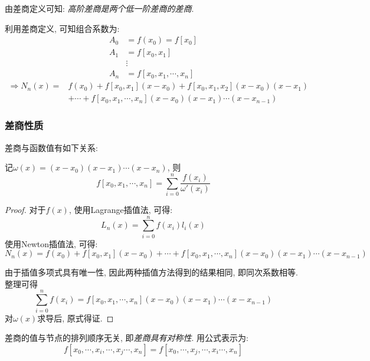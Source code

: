 由差商定义可知: \emph{高阶差商是两个低一阶差商的差商}.

利用差商定义, 可知组合系数为:
\begin{align*}
    A_0&=f(x_0)=f[x_0]\\
    A_1&=f[x_0,x_1]\\
    &\vdots\\
    A_n&=f[x_0,x_1,\cdots,x_n]
\end{align*}
\begin{align*}
    \Rightarrow N_n(x)=&f(x_0)+f[x_0,x_1](x-x_0)+f[x_0,x_1,x_2](x-x_0)(x-x_1)\\
    &+\cdots+f[x_0,x_1,\cdots,x_n](x-x_0)(x-x_1)\cdots(x-x_{n-1})
\end{align*}

\subsubsection{差商性质}

差商与函数值有如下关系:

\begin{theorem}
    记$\omega(x)=(x-x_0)(x-x_1)\cdots(x-x_n)$, 则
    \begin{equation*}
        f[x_0,x_1,\cdots,x_n]=\sum_{i=0}^n\frac{f(x_i)}{\omega'(x_i)}
    \end{equation*}
\end{theorem}

\begin{proof}
    对于$f(x)$, 使用Lagrange插值法, 可得:
    \begin{equation*}
        L_n(x)=\sum_{i=0}^nf(x_i)l_i(x)
    \end{equation*}
    使用Newton插值法, 可得:
    \begin{equation}\label{eqn:2.4.6}
        N_n(x)=f(x_0)+f[x_0,x_1](x-x_0)+\cdots+f[x_0,x_1,\cdots,x_n](x-x_0)(x-x_1)\cdots(x-x_{n-1})
    \end{equation}

    由于插值多项式具有唯一性, 因此两种插值方法得到的结果相同, 即同次系数相等. 整理可得
    \begin{equation*}
        \sum_{i=0}^nf(x_i)=f[x_0,x_1,\cdots,x_n](x-x_0)(x-x_1)\cdots(x-x_{n-1})
    \end{equation*}
    对$\omega(x)$求导后, 原式得证.
\end{proof}

差商的值与节点的排列顺序无关, 即\emph{差商具有对称性}. 用公式表示为:
\begin{equation*}
    f[x_0,\cdots,x_i,\cdots,x_j\cdots,x_n]=f[x_0,\cdots,x_j,\cdots,x_i\cdots,x_n]
\end{equation*}

